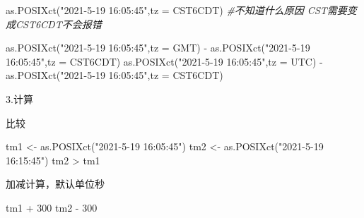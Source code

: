 \documentclass[
]{book}
\newenvironment{Shaded}{\begin{snugshade}}{\end{snugshade}}
\newcommand{\AttributeTok}[1]{\textcolor[rgb]{0.77,0.63,0.00}{#1}}
\newcommand{\CommentTok}[1]{\textcolor[rgb]{0.56,0.35,0.01}{\textit{#1}}}
\newcommand{\DecValTok}[1]{\textcolor[rgb]{0.00,0.00,0.81}{#1}}
\newcommand{\FunctionTok}[1]{\textcolor[rgb]{0.00,0.00,0.00}{#1}}
\newcommand{\NormalTok}[1]{#1}
\newcommand{\OtherTok}[1]{\textcolor[rgb]{0.56,0.35,0.01}{#1}}
\newcommand{\SpecialCharTok}[1]{\textcolor[rgb]{0.00,0.00,0.00}{#1}}
\newcommand{\StringTok}[1]{\textcolor[rgb]{0.31,0.60,0.02}{#1}}
\begin{document}
\begin{Shaded}
\begin{Highlighting}[]
\FunctionTok{as.POSIXct}\NormalTok{(}\StringTok{"2021{-}5{-}19 16:05:45"}\NormalTok{,}\AttributeTok{tz =} \StringTok{\textquotesingle{}CST6CDT\textquotesingle{}}\NormalTok{) }\CommentTok{\#不知道什么原因 CST需要变成CST6CDT不会报错}
\end{Highlighting}
\end{Shaded}

\begin{Shaded}
\begin{Highlighting}[]
\FunctionTok{as.POSIXct}\NormalTok{(}\StringTok{"2021{-}5{-}19 16:05:45"}\NormalTok{,}\AttributeTok{tz =} \StringTok{\textquotesingle{}GMT\textquotesingle{}}\NormalTok{) }\SpecialCharTok{{-}} \FunctionTok{as.POSIXct}\NormalTok{(}\StringTok{"2021{-}5{-}19 16:05:45"}\NormalTok{,}\AttributeTok{tz =} \StringTok{\textquotesingle{}CST6CDT\textquotesingle{}}\NormalTok{)}
\FunctionTok{as.POSIXct}\NormalTok{(}\StringTok{"2021{-}5{-}19 16:05:45"}\NormalTok{,}\AttributeTok{tz =} \StringTok{\textquotesingle{}UTC\textquotesingle{}}\NormalTok{) }\SpecialCharTok{{-}} \FunctionTok{as.POSIXct}\NormalTok{(}\StringTok{"2021{-}5{-}19 16:05:45"}\NormalTok{,}\AttributeTok{tz =} \StringTok{\textquotesingle{}CST6CDT\textquotesingle{}}\NormalTok{)}
\end{Highlighting}
\end{Shaded}

3.计算

比较

\begin{Shaded}
\begin{Highlighting}[]
\NormalTok{tm1 }\OtherTok{\textless{}{-}} \FunctionTok{as.POSIXct}\NormalTok{(}\StringTok{"2021{-}5{-}19 16:05:45"}\NormalTok{) }
\NormalTok{tm2 }\OtherTok{\textless{}{-}} \FunctionTok{as.POSIXct}\NormalTok{(}\StringTok{"2021{-}5{-}19 16:15:45"}\NormalTok{) }
\NormalTok{tm2 }\SpecialCharTok{\textgreater{}}\NormalTok{ tm1}
\end{Highlighting}
\end{Shaded}

加减计算，默认单位秒

\begin{Shaded}
\begin{Highlighting}[]
\NormalTok{tm1 }\SpecialCharTok{+} \DecValTok{300}
\NormalTok{tm2 }\SpecialCharTok{{-}} \DecValTok{300}
\end{Highlighting}
\end{Shaded}
\end{document}
